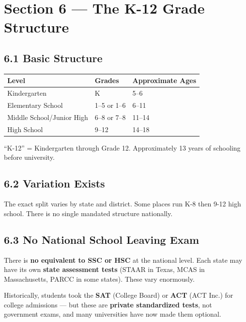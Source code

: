 \section{Section 6 --- The K-12 Grade Structure}

\subsection{6.1 Basic Structure}

\begin{center}\small
	\begin{tabularx}{0.9\textwidth}{@{} l l X @{}}
		\toprule
		\textbf{Level}            & \textbf{Grades} & \textbf{Approximate Ages} \\
		\midrule
		Kindergarten              & K               & 5--6                      \\
		Elementary School         & 1--5 or 1--6    & 6--11                     \\
		Middle School/Junior High & 6--8 or 7--8    & 11--14                    \\
		High School               & 9--12           & 14--18                    \\
		\bottomrule
	\end{tabularx}
\end{center}


	``K-12'' = Kindergarten through Grade 12. Approximately 13 years of schooling before university.

	\subsection{6.2 Variation Exists}

	The exact split varies by state and district. Some places run K-8 then 9-12 high school. There is no single mandated structure nationally.

	\subsection{6.3 No National School Leaving Exam}

	There is \textbf{no equivalent to SSC or HSC} at the national level. Each state may have its own \textbf{state assessment tests} (STAAR in Texas, MCAS in Massachusetts, PARCC in some states). These vary enormously.

	Historically, students took the \textbf{SAT} (College Board) or \textbf{ACT} (ACT Inc.) for college admissions --- but these are \textbf{private standardized tests}, not government exams, and many universities have now made them optional.

